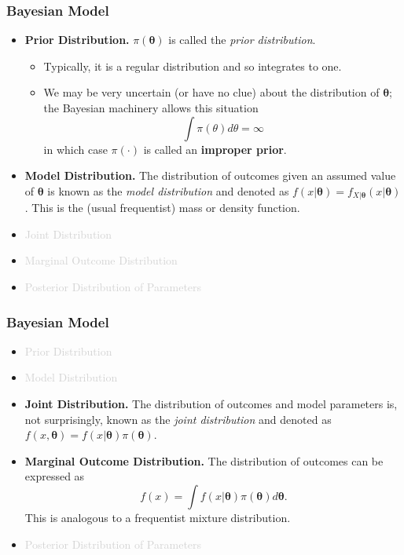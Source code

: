 \documentclass{beamer}
\begin{document}
\begin{frame}[shrink=.22]
\frametitle{Bayesian Model}
\begin{itemize}
\item \textbf{Prior Distribution.} $\pi(\boldsymbol \theta)$  is called the \textit{prior distribution}.
\begin{itemize}
\item Typically, it is a regular distribution and so integrates to one.
\item We may be very uncertain (or have no clue) about the distribution of $\boldsymbol \theta$; the Bayesian machinery allows this situation
$$ \int \pi(\theta) d\theta = \infty $$
in which case $\pi(\cdot)$ is called an \textbf{improper prior}.
\end{itemize}
\item \textbf{Model Distribution.} The distribution of outcomes given an assumed value of $\boldsymbol \theta$ is known as the \textit{model distribution} and denoted as $f(x | \boldsymbol \theta) = f_{X|\boldsymbol \theta} (x|\boldsymbol \theta )$. This is the (usual frequentist) mass or density function.
\item \textcolor{lightgray}{Joint Distribution}
\item \textcolor{lightgray}{Marginal Outcome Distribution}
\item \textcolor{lightgray}{Posterior Distribution of Parameters}
\end{itemize}
\end{frame}

\begin{frame}%
\frametitle{Bayesian Model}
\begin{itemize}
\item \textcolor{lightgray}{Prior Distribution}
\item \textcolor{lightgray}{Model Distribution}
\item \textbf{Joint Distribution.} The distribution of outcomes and model parameters is, not surprisingly, known as the \textit{joint distribution} and denoted as $f(x , \boldsymbol \theta) = f(x|\boldsymbol \theta )\pi(\boldsymbol \theta)$.
\item \textbf{Marginal Outcome Distribution.} The distribution of outcomes can be expressed as
$$f(x) =\int f(x | \boldsymbol \theta)\pi(\boldsymbol \theta) d\boldsymbol \theta.$$
This is analogous to a frequentist mixture distribution.
\item \textcolor{lightgray}{Posterior Distribution of Parameters}
\end{itemize}

\end{frame}
\end{document}
